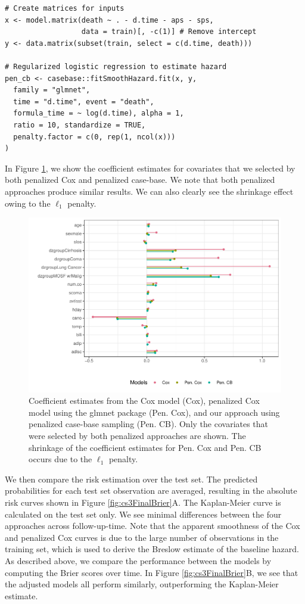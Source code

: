 \begin{verbatim}
# Create matrices for inputs
x <- model.matrix(death ~ . - d.time - aps - sps, 
                  data = train)[, -c(1)] # Remove intercept
y <- data.matrix(subset(train, select = c(d.time, death)))

# Regularized logistic regression to estimate hazard
pen_cb <- casebase::fitSmoothHazard.fit(x, y,
  family = "glmnet",
  time = "d.time", event = "death",
  formula_time = ~ log(d.time), alpha = 1,
  ratio = 10, standardize = TRUE,
  penalty.factor = c(0, rep(1, ncol(x)))
)
\end{verbatim}

In Figure \ref{fig:cs3lolliPlot}, we show the coefficient estimates for covariates that we selected by both penalized Cox and penalized case-base. We note that both penalized approaches produce similar results. We can also clearly see the shrinkage effect owing to the \(\ell_1\) penalty.

\begin{figure}[ht]
\includegraphics[width=\textwidth,keepaspectratio=true]{./cs3lolliPlot-1} \caption{Coefficient estimates from the Cox model (Cox), penalized Cox model using the glmnet package (Pen. Cox), and our approach using penalized case-base sampling (Pen. CB). Only the covariates that were selected by both penalized approaches are shown. The shrinkage of the coefficient estimates for Pen. Cox and Pen. CB occurs due to the $\ell_1$ penalty.}\label{fig:cs3lolliPlot}
\end{figure}

We then compare the risk estimation over the test set. The predicted probabilities for each test set observation are averaged, resulting in the absolute risk curves shown in Figure \ref{fig:cs3FinalBrier}A. The Kaplan-Meier curve is calculated on the test set only. We see minimal differences between the four approaches across follow-up-time. Note that the apparent smoothness of the Cox and penalized Cox curves is due to the large number of observations in the training set, which is used to derive the Breslow estimate of the baseline hazard. As described above, we compare the performance between the models by computing the Brier scores over time. In Figure \ref{fig:cs3FinalBrier}B, we see that the adjusted models all perform similarly, outperforming the Kaplan-Meier estimate.

